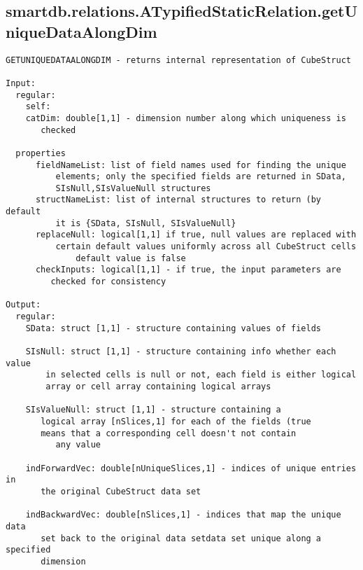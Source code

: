 \subsection{\texorpdfstring{smartdb.relations.ATypifiedStaticRelation.getUniqueDataAlongDim}{getUniqueDataAlongDim}}\label{method:smartdb.relations.ATypifiedStaticRelation.getUniqueDataAlongDim}
\begin{verbatim}
GETUNIQUEDATAALONGDIM - returns internal representation of CubeStruct

Input:
  regular:
    self:
    catDim: double[1,1] - dimension number along which uniqueness is
       checked

  properties
      fieldNameList: list of field names used for finding the unique
          elements; only the specified fields are returned in SData,
          SIsNull,SIsValueNull structures
      structNameList: list of internal structures to return (by default
          it is {SData, SIsNull, SIsValueNull}
      replaceNull: logical[1,1] if true, null values are replaced with
          certain default values uniformly across all CubeStruct cells
              default value is false
      checkInputs: logical[1,1] - if true, the input parameters are
         checked for consistency

Output:
  regular:
    SData: struct [1,1] - structure containing values of fields

    SIsNull: struct [1,1] - structure containing info whether each value
        in selected cells is null or not, each field is either logical
        array or cell array containing logical arrays

    SIsValueNull: struct [1,1] - structure containing a
       logical array [nSlices,1] for each of the fields (true
       means that a corresponding cell doesn't not contain
          any value

    indForwardVec: double[nUniqueSlices,1] - indices of unique entries in
       the original CubeStruct data set

    indBackwardVec: double[nSlices,1] - indices that map the unique data
       set back to the original data setdata set unique along a specified
       dimension
\end{verbatim}
